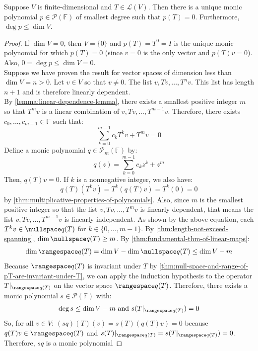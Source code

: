 \documentclass{article}
\begin{document}
\begin{theorem}
  \label{thm:existence-uniqueness-degree-minimal-polynomial}
  Suppose $V$ is finite-dimensional and $T \in \mathcal{L}(V)$. Then
  there is a unique monic polynomial $p \in \mathcal{P}(\mathbb{F})$
  of smallest degree such that $p(T) = 0$. Furthermore, $\deg p \le
  \dim V$.
\end{theorem}
\begin{proof}
  If $\dim V = 0$, then $V = \{0\}$ and $p(T) = T^0 = I$ is the unique
  monic polynomial for which $p(T) = 0$ (since $v = 0$ is the only
  vector and $p(T)v = 0$). Also, $0 = \deg p \le \dim V = 0$. \\
  Suppose we have proven the result for vector spaces of dimension
  less than $\dim V = n > 0$. Let $v \in V$ so that $v \ne 0$. The
  list $v, Tv, ..., T^nv$. This list has length $n + 1$ and is
  therefore linearly dependent. \\
  By \cref{lemma:linear-dependence-lemma}, there exists a smallest
  positive integer $m$ so that $T^mv$ is a linear combination of $v,
  Tv, ..., T^{m-1}v$. Therefore, there exists $c_0,...,c_{m-1} \in
  \mathbb{F}$ such that:
  $$\sum_{k=0}^{m-1} c_k T^kv + T^m v = 0$$
  Define a monic polynomial $q \in \mathcal{P}_m(\mathbb{F})$ by:
  $$q(z) = \sum_{k=0}^{m-1} c_k z^k + z^m$$
  Then, $q(T)v = 0$. If $k$ is a nonnegative integer, we also have:
  $$q(T)(T^kv) = T^k(q(T)v) = T^k(0) = 0$$
  by \cref{thm:multiplicative-properties-of-polynomials}. Also, since
  $m$ is the smallest positive integer so that the list $v, Tv, ...,
  T^mv$ is linearly dependent, that means the list $v, Tv, ...,
  T^{m-1}v$ is linearly independent. As shown by the above equation,
  each $T^kv \in \nullspace q(T)$ for $k \in \{0, ..., m-1\}$. By
  \cref{thm:length-not-exceed-spanning}, $\dim \nullspace q(T) \ge
  m$. By \cref{thm:fundamental-thm-of-linear-maps}:
  $$\dim \rangespace q(T) = \dim V - \dim \nullspace q(T) \le \dim V
  - m$$
  Because $\rangespace q(T)$ is invariant under $T$ by
  \cref{thm:null-space-and-range-of-pT-are-invariant-under-T}, we can
  apply the induction hypothesis to the operator $T|_{\rangespace
    q(T)}$ on the vector space $\rangespace q(T)$. Therefore, there
  exists a monic polynomial $s \in \mathcal{P}(\mathbb{F})$ with:
  $$\deg s \le \dim V - m \text{ and } s(T|_{\rangespace q(T)}) = 0$$
  So, for all $v \in V$:
  $(sq)(T)(v) = s(T)(q(T)v) = 0$
  because $q(T)v \in \rangespace q(T)$ and $s(T)|_{\rangespace q(T)} =
  s(T|_{\rangespace q(T)}) = 0$. Therefore, $sq$ is a monic polynomial

\end{proof}
\end{document}
